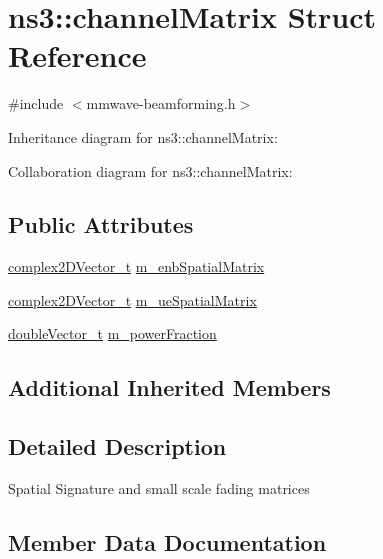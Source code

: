 \hypertarget{structns3_1_1channelMatrix}{}\section{ns3\+:\+:channel\+Matrix Struct Reference}
\label{structns3_1_1channelMatrix}


{\ttfamily \#include $<$mmwave-\/beamforming.\+h$>$}



Inheritance diagram for ns3\+:\+:channel\+Matrix\+:


Collaboration diagram for ns3\+:\+:channel\+Matrix\+:
\subsection*{Public Attributes}
\begin{DoxyCompactItemize}
\item 
\hyperlink{namespacens3_aa25e3feece2676fd7470d50d4ba3d1d1}{complex2\+D\+Vector\+\_\+t} \hyperlink{structns3_1_1channelMatrix_a1de56012f2e517038a0d8f4e31f37b4e}{m\+\_\+enb\+Spatial\+Matrix}
\item 
\hyperlink{namespacens3_aa25e3feece2676fd7470d50d4ba3d1d1}{complex2\+D\+Vector\+\_\+t} \hyperlink{structns3_1_1channelMatrix_af524c81d5e873af24ca3d994d16c1ee6}{m\+\_\+ue\+Spatial\+Matrix}
\item 
\hyperlink{namespacens3_aa6f1edf6566ca6afec613bc6e40240ea}{double\+Vector\+\_\+t} \hyperlink{structns3_1_1channelMatrix_a4e2c23479a94f0046d085c7969595fbd}{m\+\_\+power\+Fraction}
\end{DoxyCompactItemize}
\subsection*{Additional Inherited Members}


\subsection{Detailed Description}
Spatial Signature and small scale fading matrices 

\subsection{Member Data Documentation}
